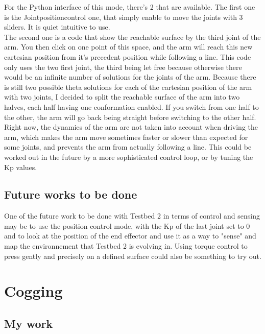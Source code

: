 \documentclass{article}
\begin{document}
For the Python interface of this mode, there's 2 that are available. The first one is the Jointpositioncontrol one, that simply enable to move the joints with 3 sliders. It is quiet intuitive to use.
\vspace{0.1cm}
\\
The second one is a code that show the reachable surface by the third joint of the arm. You then click on one point of this space, and the arm will reach this new cartesian position from it's precedent position while following a line. This code only uses the two first joint, the third being let free because otherwise there would be an infinite number of solutions for the joints of the arm. Because there is still two possible theta solutions for each of the cartesian position of the arm with two joints, I decided to split the reachable surface of the arm into two halves, each half having one conformation enabled. If you switch from one half to the other, the arm will go back being straight before switching to the other half.
\vspace{0.1cm}
\\
Right now, the dynamics of the arm are not taken into account when driving the arm, which makes the arm move sometimes faster or slower than expected for some joints, and prevents the arm from actually following a line. This could be worked out in the future by a more sophisticated control loop, or by tuning the Kp values.


\subsection{Future works to be done}

One of the future work to be done with Testbed 2 in terms of control and sensing may be to use the position control mode, with the Kp of the last joint set to 0 and to look at the position of the end effector and use it as a way to "sense" and map the environnement that Testbed 2 is evolving in. Using torque control to press gently and precisely on a defined surface could also be something to try out.

\newpage
\section{Cogging}

\subsection{My work}
\end{document}
